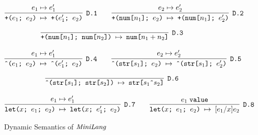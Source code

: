 \begin{figure}[htb]
\[
\cinfer[D.1]{+($e_1$; $e_2$) $\stepto$ +($e'_1$; $e_2$)}{e_1 \stepto e'_1}
\qquad
\cinfer[D.2]{+(num[$n_1$]; $e_2$) $\stepto$ +(num[$n_1$]; $e'_2$)}{e_2 \stepto e'_2}
\]

\[
\cinfer[D.3]{+(num[$n_1$]; num[$n_2$]) $\stepto$ num[$n_1 + n_2$]}{ }
\]

\[
\cinfer[D.4]{\^{}($e_1$; $e_2$) $\stepto$ \^{}($e'_1$; $e_2$)}{e_1 \stepto e'_1}
\qquad
\cinfer[D.5]{\^{}(str[$s_1$]; $e_2$) $\stepto$ \^{}(str[$s_1$]; $e'_2$)}{e_2 \stepto e'_2}
\]

\[
\cinfer[D.6]{\^{}(str[$s_1$]; str[$s_2$]) $\stepto$ str[$s_1 \texttt{\^{}} s_2$]}{ }
\]

\[
\cinfer[D.7]{let($x$; $e_1$; $e_2$) $\stepto$ let($x$; $e'_1$; $e_2$)}{e_1 \stepto e'_1}
\qquad
\cinfer[D.8]{let($x$; $e_1$; $e_2$) $\stepto$ $[e_1 / x]e_2$}{e_1 \; \texttt{value}}
\]
\caption{Dynamic Semantics of $\mathit{MiniLang}$}
\label{fig:eval_rules} 
\end{figure}
